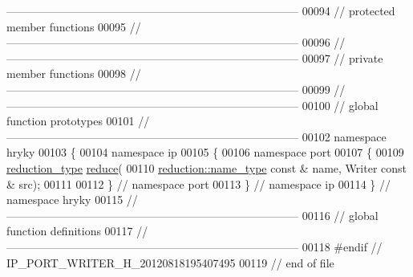 \begin{DoxyCode}
{      ------------------------------------------------------------------------------}
00094 \textcolor{comment}{// protected member functions}
00095 \textcolor{comment}{//
      ------------------------------------------------------------------------------}
00096 \textcolor{comment}{//
      ------------------------------------------------------------------------------}
00097 \textcolor{comment}{// private member functions}
00098 \textcolor{comment}{//
      ------------------------------------------------------------------------------}
00099 \textcolor{comment}{//
      ------------------------------------------------------------------------------}
00100 \textcolor{comment}{// global function prototypes}
00101 \textcolor{comment}{//
      ------------------------------------------------------------------------------}
00102 \textcolor{keyword}{namespace }hryky
00103 \{
00104 \textcolor{keyword}{namespace }ip
00105 \{
00106 \textcolor{keyword}{namespace }port
00107 \{
00109     \hyperlink{namespacehryky_a343a9a4c36a586be5c2693156200eadc}{reduction_type} \hyperlink{namespacehryky_af41cb3af6766761da0ff21b84527a52c}{reduce}(
00110         \hyperlink{namespacehryky_1_1reduction_ac686c30a4c8d196bbd0f05629a6b921f}{reduction::name_type} \textcolor{keyword}{const} & name, Writer \textcolor{keyword}{const} & src);
00111 
00112 \} \textcolor{comment}{// namespace port}
00113 \} \textcolor{comment}{// namespace ip}
00114 \} \textcolor{comment}{// namespace hryky}
00115 \textcolor{comment}{//
      ------------------------------------------------------------------------------}
00116 \textcolor{comment}{// global function definitions}
00117 \textcolor{comment}{//
      ------------------------------------------------------------------------------}
00118 \textcolor{preprocessor}{#endif // IP\_PORT\_WRITER\_H\_20120818195407495}
00119 \textcolor{preprocessor}{}\textcolor{comment}{// end of file}
\end{DoxyCode}
